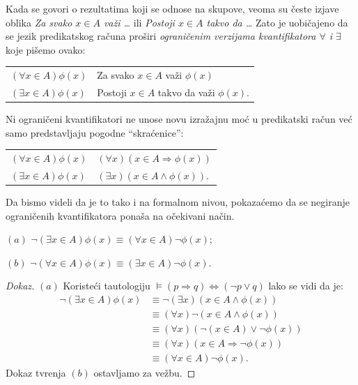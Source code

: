 Kada se govori o rezultatima koji se odnose na skupove, veoma su \v ceste izjave oblika
  \textit{Za svako $x \in A$ va\v zi \ldots}
ili
  \textit{Postoji $x \in A$ takvo da \ldots}
Zato je uobi\v cajeno da se jezik predikatskog ra\v cuna pro\v siri \emph{ograni\v cenim verzijama kvantifikatora $\forall$
i $\exists$} koje pi\v semo ovako:
\begin{center}
  \begin{tabular}{l@{\quad$\leadsto$\quad}l}
    $(\forall x \in A) \phi(x)$ & Za svako $x \in A$ va\v zi $\phi(x)$\\
    $(\exists x \in A) \phi(x)$ & Postoji $x \in A$ takvo da va\v zi $\phi(x).$
  \end{tabular}
\end{center}
Ni ograni\v ceni kvantifikatori ne unose novu izra\v zajnu mo\'c u predikatski ra\v cun ve\'c samo
predstavljaju pogodne \enquote{skra\'cenice}:
\begin{center}
  \begin{tabular}{l@{\quad je skra\'ceni zapis formule\quad}l}
    $(\forall x \in A) \phi(x)$ & $(\forall x)(x \in A \Rightarrow \phi(x))$ \\
    $(\exists x \in A) \phi(x)$ & $(\exists x)(x \in A  \land      \phi(x))$.
  \end{tabular}
\end{center}
Da bismo videli da je to tako i na formalnom nivou, pokaza\'cemo da se negiranje ograni\v cenih kvantifikatora pona\v sa
na o\v cekivani na\v cin.

\begin{THM}
  $(a)$ $\lnot (\exists x \in A) \phi(x) \equiv (\forall x \in A) \lnot \phi(x)$;

  $(b)$ $\lnot (\forall x \in A) \phi(x) \equiv (\exists x \in A) \lnot \phi(x)$.
\end{THM}
\begin{proof}[Dokaz]
  $(a)$ Koriste\'ci tautologiju $\models (p \Rightarrow q) \Leftrightarrow (\lnot p \lor q)$
  lako se vidi da je:
  \begin{align*}
    \lnot (\exists x \in A) \phi(x)
    & \equiv \lnot (\exists x)(x \in A \land \phi(x))\\
    & \equiv (\forall x)\lnot(x \in A \land \phi(x))\\
    & \equiv (\forall x)(\lnot(x \in A) \lor \lnot \phi(x))\\
    & \equiv (\forall x)(x \in A \Rightarrow \lnot \phi(x))\\
    & \equiv (\forall x \in A) \lnot \phi(x).
  \end{align*}
  Dokaz tvr\dj enja $(b)$ ostavljamo za ve\v zbu.
\end{proof}


